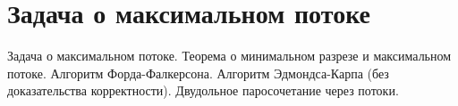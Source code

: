 \section{Задача о максимальном потоке}
Задача о максимальном потоке.
Теорема о минимальном разрезе и максимальном потоке.
Алгоритм Форда-Фалкерсона.
Алгоритм Эдмондса-Карпа (без доказательства корректности).
Двудольное паросочетание через потоки.
